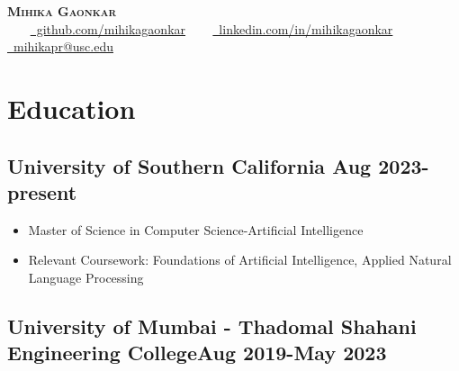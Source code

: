 \documentclass[10pt]{article}
\newenvironment{zitemize}{
\begin{itemize}\itemsep2pt \parskip0pt \parsep1pt}
{\end{itemize}\vspace{-0.7cm}}
\begin{document}




\begin{center}
    {\HUGE \scshape \textbf{Mihika Gaonkar} } \\ \vspace{5pt}
      ~~~
    \href{https://github.com/mihikagaonkar}{\raisebox{-0.2\height}\ github.com/mihikagaonkar} ~~~
    \href{https://linkedin.com/in/mihikagaonkar}{\raisebox{-0.2\height}\ linkedin.com/in/mihikagaonkar} ~~~
    \href{mailto:mihikapr@usc.edu}{\raisebox{-0.2\height}\  mihikapr@usc.edu}
    \vspace{-13pt}
\end{center}







\vspace{-0.3cm}
\section{\textbf{Education}}
    \subsection*{University of Southern California
    \hfill \normalsize \textbf{Aug 2023-present}} 

    \begin{zitemize}
        \item Master of Science in Computer Science-Artificial Intelligence 
        \item Relevant Coursework: Foundations of Artificial Intelligence, Applied Natural Language Processing
    \end{zitemize}
    \vspace{0.1cm}
    \subsection*{University of Mumbai - Thadomal Shahani Engineering College\hfill \normalsize \textbf{Aug 2019-May 2023}} 
\end{document}
